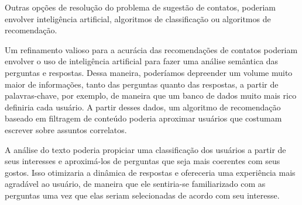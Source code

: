 Outras opções de resolução do problema de sugestão de contatos, poderiam envolver inteligência artificial, algoritmos de classificação ou algoritmos de recomendação.

Um refinamento valioso para a acurácia das recomendações de contatos poderiam envolver o uso de inteligência artificial para fazer uma análise semântica das perguntas e respostas. Dessa maneira, poderíamos depreender um volume muito maior de informações, tanto das perguntas quanto das respostas, a partir de palavras-chave, por exemplo, de maneira que um banco de dados muito mais rico definiria cada usuário. A partir desses dados, um algoritmo de recomendação baseado em filtragem de conteúdo poderia aproximar usuários que costumam escrever sobre assuntos correlatos.

A análise do texto poderia propiciar uma classificação dos usuários a partir de seus interesses e aproximá-los de perguntas que seja mais coerentes com seus gostos. Isso otimizaria a dinâmica de respostas e ofereceria uma experiência mais agradável ao usuário, de maneira que ele sentiria-se familiarizado com as perguntas uma vez que elas seriam selecionadas de acordo com seu interesse.







